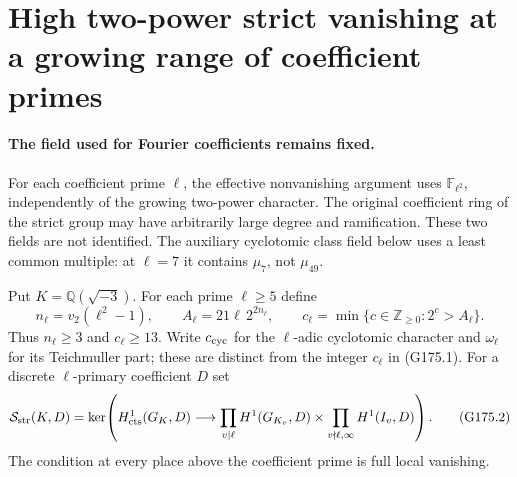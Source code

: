 \section{High two-power strict vanishing at a growing range of coefficient primes}
\label{sec:effective-two-power-all-odd-primes}

\paragraph{The field used for Fourier coefficients remains fixed.}
For each coefficient prime $\ell$, the effective nonvanishing argument
uses $\mathbb F_{\ell^2}$, independently of the growing two-power
character.  The original coefficient ring of the strict group may
have arbitrarily large degree and ramification.  These two fields
are not identified.  The auxiliary cyclotomic class field below uses
a least common multiple: at $\ell=7$ it contains $\mu_7$, not
$\mu_{49}$.

Put $K=\mathbb Q(\sqrt{-3})$.  For each prime $\ell\geq5$ define
\[
 n_\ell=v_2(\ell^2-1),\qquad
 A_\ell=21\ell\,2^{2n_\ell},\qquad
 c_\ell=\min\{c\in\mathbb Z_{\geq0}:2^c>A_\ell\}.
 \tag{G175.1}
\]
Thus $n_\ell\geq3$ and $c_\ell\geq13$.
Write $c_{\rm cyc}$ for the $\ell$-adic cyclotomic character and
$\omega_\ell$ for its Teichmuller part; these are distinct from
the integer $c_\ell$ in (G175.1).
For a discrete $\ell$-primary coefficient $D$ set
\[
 \mathcal S_{\rm str}(K,D)=
 \ker\!\left(H^1_{\rm cts}(G_K,D)\longrightarrow
  \prod_{v\mid\ell}H^1(G_{K_v},D)
       \times\prod_{v\nmid\ell,\infty}H^1(I_v,D)\right).
 \tag{G175.2}
\]
The condition at every place above the coefficient prime is full
local vanishing.

